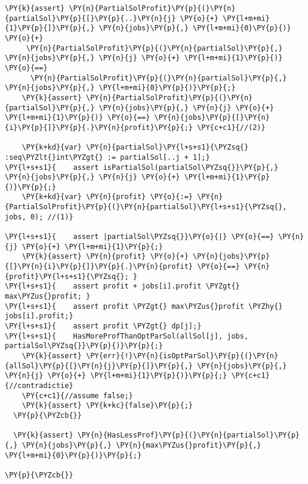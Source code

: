 \begin{Verbatim}[commandchars=\\\{\},fontsize=\small]
    \PY{k}{assert} \PY{n}{PartialSolProfit}\PY{p}{(}\PY{n}{partialSol}\PY{p}{[}\PY{p}{..}\PY{n}{j} \PY{o}{+} \PY{l+m+mi}{1}\PY{p}{]}\PY{p}{,} \PY{n}{jobs}\PY{p}{,} \PY{l+m+mi}{0}\PY{p}{)} \PY{o}{+}
     \PY{n}{PartialSolProfit}\PY{p}{(}\PY{n}{partialSol}\PY{p}{,} \PY{n}{jobs}\PY{p}{,} \PY{n}{j} \PY{o}{+} \PY{l+m+mi}{1}\PY{p}{)} \PY{o}{==}
      \PY{n}{PartialSolProfit}\PY{p}{(}\PY{n}{partialSol}\PY{p}{,} \PY{n}{jobs}\PY{p}{,} \PY{l+m+mi}{0}\PY{p}{)}\PY{p}{;}
    \PY{k}{assert} \PY{n}{PartialSolProfit}\PY{p}{(}\PY{n}{partialSol}\PY{p}{,} \PY{n}{jobs}\PY{p}{,} \PY{n}{j} \PY{o}{+} \PY{l+m+mi}{1}\PY{p}{)} \PY{o}{==} \PY{n}{jobs}\PY{p}{[}\PY{n}{i}\PY{p}{]}\PY{p}{.}\PY{n}{profit}\PY{p}{;} \PY{c+c1}{//(2)}

    \PY{k+kd}{var} \PY{n}{partialSol}\PY{l+s+s1}{\PYZsq{} :seq\PYZlt{}int\PYZgt{} := partialSol[..j + 1];}
\PY{l+s+s1}{    assert isPartialSol(partialSol\PYZsq{}}\PY{p}{,} \PY{n}{jobs}\PY{p}{,} \PY{n}{j} \PY{o}{+} \PY{l+m+mi}{1}\PY{p}{)}\PY{p}{;}
    \PY{k+kd}{var} \PY{n}{profit} \PY{o}{:=} \PY{n}{PartialSolProfit}\PY{p}{(}\PY{n}{partialSol}\PY{l+s+s1}{\PYZsq{}, jobs, 0); //(1)}

\PY{l+s+s1}{    assert |partialSol\PYZsq{}}\PY{o}{|} \PY{o}{==} \PY{n}{j} \PY{o}{+} \PY{l+m+mi}{1}\PY{p}{;}
    \PY{k}{assert} \PY{n}{profit} \PY{o}{+} \PY{n}{jobs}\PY{p}{[}\PY{n}{i}\PY{p}{]}\PY{p}{.}\PY{n}{profit} \PY{o}{==} \PY{n}{profit}\PY{l+s+s1}{\PYZsq{}; }
\PY{l+s+s1}{    assert profit + jobs[i].profit \PYZgt{} max\PYZus{}profit; }
\PY{l+s+s1}{    assert profit \PYZgt{} max\PYZus{}profit \PYZhy{} jobs[i].profit;}
\PY{l+s+s1}{    assert profit \PYZgt{} dp[j];}
\PY{l+s+s1}{    HasMoreProfThanOptParSol(allSol[j], jobs, partialSol\PYZsq{}}\PY{p}{)}\PY{p}{;}
    \PY{k}{assert} \PY{err}{!}\PY{n}{isOptParSol}\PY{p}{(}\PY{n}{allSol}\PY{p}{[}\PY{n}{j}\PY{p}{]}\PY{p}{,} \PY{n}{jobs}\PY{p}{,} \PY{n}{j} \PY{o}{+} \PY{l+m+mi}{1}\PY{p}{)}\PY{p}{;} \PY{c+c1}{//contradictie}
    \PY{c+c1}{//assume false;}
    \PY{k}{assert} \PY{k+kc}{false}\PY{p}{;}
  \PY{p}{\PYZcb{}}

  \PY{k}{assert} \PY{n}{HasLessProf}\PY{p}{(}\PY{n}{partialSol}\PY{p}{,} \PY{n}{jobs}\PY{p}{,} \PY{n}{max\PYZus{}profit}\PY{p}{,} \PY{l+m+mi}{0}\PY{p}{)}\PY{p}{;}

\PY{p}{\PYZcb{}}
\end{Verbatim}


